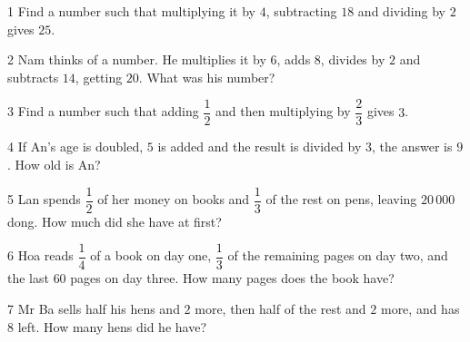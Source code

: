 \begin{probbox}{1}{\relax}
Find a number such that multiplying it by $4$, subtracting $18$ and dividing by $2$ gives $25$.
\end{probbox}
\gap
\begin{probbox}{2}{\relax}
Nam thinks of a number. He multiplies it by $6$, adds $8$, divides by $2$ and subtracts $14$, getting $20$. What was his number?
\end{probbox}
\gap
\begin{probbox}{3}{\relax}
Find a number such that adding $\dfrac12$ and then multiplying by $\dfrac23$ gives $3$.
\end{probbox}
\gap
\begin{probbox}{4}{\relax}
If An's age is doubled, $5$ is added and the result is divided by $3$, the answer is $9$. How old is An?
\end{probbox}
\gap
\begin{probbox}{5}{\relax}
Lan spends $\dfrac12$ of her money on books and $\dfrac13$ of the rest on pens, leaving $20\,000$ dong. How much did she have at first?
\end{probbox}
\gap
\begin{probbox}{6}{\relax}
Hoa reads $\dfrac14$ of a book on day one, $\dfrac13$ of the remaining pages on day two, and the last $60$ pages on day three. How many pages does the book have?
\end{probbox}
\gap
\begin{probbox}{7}{\relax}
Mr Ba sells half his hens and $2$ more, then half of the rest and $2$ more, and has $8$ left. How many hens did he have?
\end{probbox}
